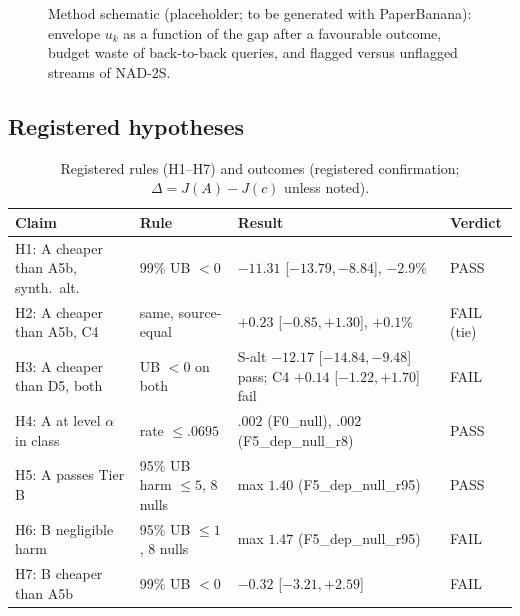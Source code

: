 \begin{figure}[t]
\centering
{}
\caption{Method schematic (placeholder; to be generated with PaperBanana): envelope $u_k$ as a function of the gap after a favourable outcome, budget waste of back-to-back queries, and flagged versus unflagged streams of NAD-2S.}\label{fig:schematic}
\end{figure}

\subsection{Registered hypotheses}

\begin{table}[t]
\caption{Registered rules (H1--H7) and outcomes (registered confirmation; $\Delta=J(A)-J(c)$ unless noted).}\label{tab:hyp}
\centering\scriptsize
\begin{tabular}{@{}p{}p{}p{}l@{}}
\toprule
Claim & Rule & Result & Verdict \\
\midrule
H1: A cheaper than A5b, synth.\ alt. & 99\% UB $<0$ & $-11.31$ [$-13.79,-8.84$], $-2.9\%$ & PASS \\
H2: A cheaper than A5b, C4 & same, source-equal & $+0.23$ [$-0.85,+1.30$], $+0.1\%$ & FAIL (tie) \\
H3: A cheaper than D5, both & UB $<0$ on both & S-alt $-12.17$ [$-14.84,-9.48$] pass; C4 $+0.14$ [$-1.22,+1.70$] fail & FAIL \\
H4: A at level $\alpha$ in class & rate $\le.0695$ & $.002$ (F0\_null), $.002$ (F5\_dep\_null\_r8) & PASS \\
H5: A passes Tier B & 95\% UB harm $\le5$, 8 nulls & max $1.40$ (F5\_dep\_null\_r95) & PASS \\
H6: B negligible harm & 95\% UB $\le1$, 8 nulls & max $1.47$ (F5\_dep\_null\_r95) & FAIL \\
H7: B cheaper than A5b & 99\% UB $<0$ & $-0.32$ [$-3.21,+2.59$] & FAIL \\
\bottomrule
\end{tabular}
\end{table}

